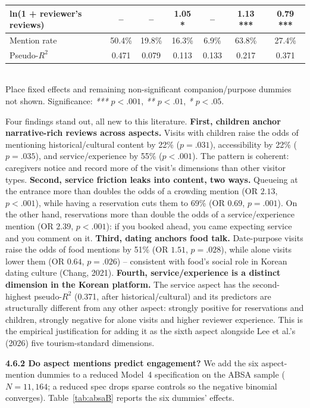 \documentclass[10pt,a4paper]{article}
\begin{document}
\begin{table}[H]
\begin{tabular}{@{}lcccccc@{}}
ln(1 + reviewer's reviews)      & --         & --         & 1.05 *      & --         & 1.13 ***    & 0.79 ***    \\
\midrule
Mention rate                    & 50.4\%      & 19.8\%      & 16.3\%      & 6.9\%       & 63.8\%      & 27.4\%      \\
Pseudo-$R^2$                    & 0.471       & 0.079       & 0.113       & 0.133       & 0.217       & 0.371       \\
\bottomrule
\end{tabular}
\\[3pt]
{\scriptsize Place fixed effects and remaining non-significant companion/purpose dummies not shown. Significance: \textit{***} $p<.001$, \textit{**} $p<.01$, \textit{*} $p<.05$.}
\end{table}

Four findings stand out, all new to this literature.
\textbf{First, children anchor narrative-rich reviews across aspects.}
Visits with children raise the odds of mentioning historical/cultural
content by 22\% ($p=.031$), accessibility by 22\% ($p=.035$), and
service/experience by 55\% ($p<.001$). The pattern is coherent:
caregivers notice and record more of the visit's dimensions than other
visitor types.
\textbf{Second, service friction leaks into content, two ways.}
Queueing at the entrance more than doubles the odds of a crowding
mention (OR $2.13$, $p<.001$), while having a reservation cuts them to
69\% (OR $0.69$, $p=.001$). On the other hand, reservations more than
double the odds of a service/experience mention (OR $2.39$, $p<.001$):
if you booked ahead, you came expecting service and you comment on it.
\textbf{Third, dating anchors food talk.} Date-purpose visits raise the
odds of food mentions by 51\% (OR $1.51$, $p=.028$), while alone visits
lower them (OR $0.64$, $p=.026$) -- consistent with food's social role
in Korean dating culture (Chang, 2021).
\textbf{Fourth, service/experience is a distinct dimension in the
Korean platform.} The service aspect has the second-highest pseudo-$R^2$
(0.371, after historical/cultural) and its predictors are structurally
different from any other aspect: strongly positive for reservations and
children, strongly negative for alone visits and higher reviewer
experience. This is the empirical justification for adding it as the
sixth aspect alongside Lee et al.'s (2026) five tourism-standard
dimensions.

\textbf{4.6.2 Do aspect mentions predict engagement?} We add the six
aspect-mention dummies to a reduced Model~4 specification on the ABSA
sample ($N=11{,}164$; a reduced spec drops sparse controls so the
negative binomial converges). Table~\ref{tab:absaB} reports the six
dummies' effects.
\end{document}
